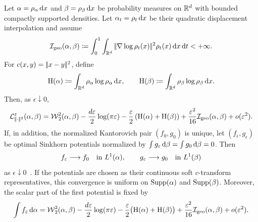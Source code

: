 \begin{prop}\label{prop-small-epsilon-expansion}
	Let $\alpha=\rho_{\alpha}\,\mathrm{d} x$ and $\beta=\rho_{\beta}\,\mathrm{d} x$ be probability measures on $\mathbb{R}^d$ with bounded compactly supported densities. Let $\alpha_t=\rho_t\,\mathrm{d} x$ be their quadratic displacement interpolation and assume
	\[
		\mathcal I_{\rm geo}(\alpha,\beta)\coloneqq
		\int_0^1\int_{\mathbb{R}^d} |\!| \nabla\log\rho_t(x) |\!|^2\rho_t(x)\,\mathrm{d} x\,\mathrm{d} t<+\infty.
	\]
	For $c(x,y)=|\!| x-y |\!|^2$, define
	\[
		\mathrm H(\alpha)\coloneqq\int_{\mathbb{R}^d}\rho_{\alpha}\log\rho_{\alpha}\,\mathrm{d} x,
		\qquad
		\mathrm H(\beta)\coloneqq\int_{\mathbb{R}^d}\rho_{\beta}\log\rho_{\beta}\,\mathrm{d} x.
	\]
	Then, as $\epsilon\downarrow0$,
	\[
		\mathcal{L}_{|\!| \cdot |\!|^2}^{\varepsilon}(\alpha,\beta)
		=
		\operatorname{\mathcal{W}}_2^2(\alpha,\beta)
		-\frac{d\varepsilon}{2}\log(\pi\varepsilon)
		-\frac{\varepsilon}{2}\left( \mathrm H(\alpha)+\mathrm H(\beta) \right)
		+\frac{\varepsilon^2}{16}\mathcal I_{\rm geo}(\alpha,\beta)
		+o(\varepsilon^2).
	\]
	If, in addition, the normalized Kantorovich pair $(f_0,g_0)$ is unique, let $(f_\epsilon,g_\epsilon)$ be optimal Sinkhorn potentials normalized by $\int g_\varepsilon\,\mathrm{d}\beta=\int g_0\,\mathrm{d}\beta=0$. Then
	\[
		f_\varepsilon\longrightarrow f_0\quad\text{in }L^1(\alpha),
		\qquad
		g_\varepsilon\longrightarrow g_0\quad\text{in }L^1(\beta)
	\]
	as $\epsilon\downarrow0$~\cite{NutzWiesel2022EntropicPotentials}. If the potentials are chosen as their continuous soft $c$-transform representatives, this convergence is uniform on $\operatorname{Supp}(\alpha)$ and $\operatorname{Supp}(\beta)$. Moreover, the scalar part of the first potential is fixed by
	\[
		\int f_\varepsilon\,\mathrm{d}\alpha
		=
		\operatorname{\mathcal{W}}_2^2(\alpha,\beta)
		-\frac{d\varepsilon}{2}\log(\pi\varepsilon)
		-\frac{\varepsilon}{2}\bigl(\mathrm H(\alpha)+\mathrm H(\beta)\bigr)
		+\frac{\varepsilon^2}{16}\mathcal I_{\rm geo}(\alpha,\beta)
		+o(\varepsilon^2).
	\]
\end{prop}

